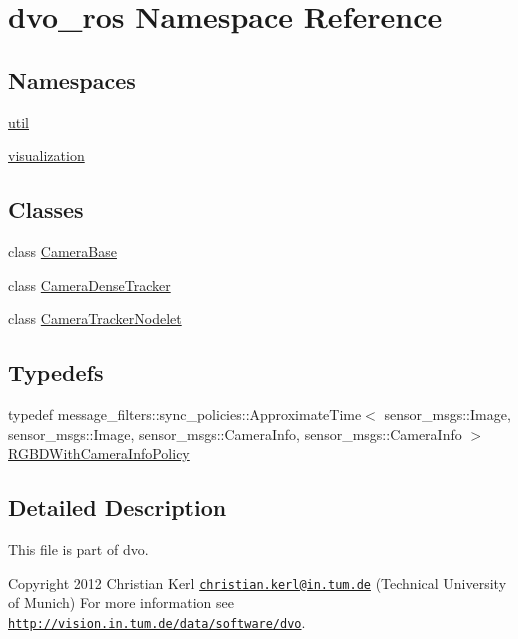 \hypertarget{namespacedvo__ros}{}\section{dvo\+\_\+ros Namespace Reference}
\label{namespacedvo__ros}
\subsection*{Namespaces}
\begin{DoxyCompactItemize}
\item 
 \mbox{\hyperlink{namespacedvo__ros_1_1util}{util}}
\item 
 \mbox{\hyperlink{namespacedvo__ros_1_1visualization}{visualization}}
\end{DoxyCompactItemize}
\subsection*{Classes}
\begin{DoxyCompactItemize}
\item 
class \mbox{\hyperlink{classdvo__ros_1_1_camera_base}{Camera\+Base}}
\item 
class \mbox{\hyperlink{classdvo__ros_1_1_camera_dense_tracker}{Camera\+Dense\+Tracker}}
\item 
class \mbox{\hyperlink{classdvo__ros_1_1_camera_tracker_nodelet}{Camera\+Tracker\+Nodelet}}
\end{DoxyCompactItemize}
\subsection*{Typedefs}
\begin{DoxyCompactItemize}
\item 
typedef message\+\_\+filters\+::sync\+\_\+policies\+::\+Approximate\+Time$<$ sensor\+\_\+msgs\+::\+Image, sensor\+\_\+msgs\+::\+Image, sensor\+\_\+msgs\+::\+Camera\+Info, sensor\+\_\+msgs\+::\+Camera\+Info $>$ \mbox{\hyperlink{namespacedvo__ros_ae8c4d74734d4ef3107bf429ef461e553}{R\+G\+B\+D\+With\+Camera\+Info\+Policy}}
\end{DoxyCompactItemize}


\subsection{Detailed Description}
This file is part of dvo.

Copyright 2012 Christian Kerl \href{mailto:christian.kerl@in.tum.de}{\tt christian.\+kerl@in.\+tum.\+de} (Technical University of Munich) For more information see \href{http://vision.in.tum.de/data/software/dvo}{\tt http\+://vision.\+in.\+tum.\+de/data/software/dvo}.

